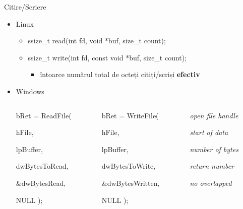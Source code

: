\documentclass{so.cs.pub.ro}
\begin{document}
\begin{frame}{Citire/Scriere}
  \begin{itemize}
    \item Linux
    \begin{itemize}
      \item ssize_t read(int fd, void *buf, size_t count);
      \item ssize_t write(int fd, const void *buf, size_t count);
      \begin{itemize}
	\item întoarce numărul total de octeți citiți/scriși \textbf{efectiv}
      \end{itemize}
    \end{itemize}
    \item Windows
    \vspace*{0.4cm}
    \begin{columns}
      \begin{column}[1]{0.3\textwidth}
bRet = ReadFile(

\hspace*{0.4cm}   hFile,         

\hspace*{0.4cm}   lpBuffer,      

\hspace*{0.4cm}   dwBytesToRead, 

\hspace*{0.4cm}   \&dwBytesRead, 

\hspace*{0.4cm}   NULL            
);
      \end{column}
      \begin{column}[1]{0.32\textwidth}
bRet = WriteFile( 

\hspace*{0.2cm}   hFile,           

\hspace*{0.2cm}   lpBuffer,

\hspace*{0.2cm}   dwBytesToWrite,

\hspace*{0.2cm}   \&dwBytesWritten,

\hspace*{0.2cm}   NULL              
); 
      \end{column}
      \begin{column}[1]{0.3\textwidth}
  \vspace{0.2cm}

  \textit{open file handle}

  \textit{start of data}

  \textit{number of bytes}

  \textit{return number}

  \textit{no overlapped}

      \end{column}
    \end{columns}
  \end{itemize}
\end{frame}
\end{document}
